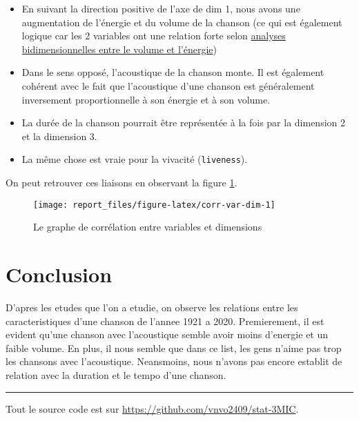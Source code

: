\documentclass[
  11pt,
  xcolor = usenames,dvipsnames]{article}
\newcommand{\passthrough}[1]{#1}
\providecommand{\tightlist}{%
  \setlength{\itemsep}{0pt}\setlength{\parskip}{0pt}}
\begin{document}
\begin{itemize}
\tightlist
\item
  En suivant la direction positive de l'axe de dim 1, nous avons une augmentation de l'énergie et du volume de la chanson (ce qui est également logique car les 2 variables ont une relation forte selon \protect\hyperlink{volume-energy}{analyses bidimensionnelles entre le volume et l'énergie})
\item
  Dans le sens opposé, l'acoustique de la chanson monte. Il est également cohérent avec le fait que l'acoustique d'une chanson est généralement inversement proportionnelle à son énergie et à son volume.
\item
  La durée de la chanson pourrait être représentée à la fois par la dimension 2 et la dimension 3.
\item
  La même chose est vraie pour la vivacité (\passthrough{\lstinline!liveness!}).
\end{itemize}

On peut retrouver ces liaisons en observant la figure \ref{fig:corr-var-dim}.

\begin{figure}

{\centering \texttt{[image: report\_files/figure-latex/corr-var-dim-1]} 

}

\caption{Le graphe de corrélation entre variables et dimensions}\label{fig:corr-var-dim}
\end{figure}

\hypertarget{conclusion}{%
\section{Conclusion}\label{conclusion}}

D'apres les etudes que l'on a etudie, on observe les relations entre les caracteristiques d'une chanson de l'annee 1921 a 2020.
Premierement, il est evident qu'une chanson avec l'acoustique semble avoir moins d'energie et un faible volume.
En plus, il nous semble que dans ce list, les gens n'aime pas trop les chansons avec l'acoustique.
Neansmoins, nous n'avons pas encore establit de relation avec la duration et le tempo d'une chanson.

\begin{center}\rule{0.5\linewidth}{0.5pt}\end{center}

Tout le source code est sur \url{https://github.com/vnvo2409/stat-3MIC}.
\end{document}
